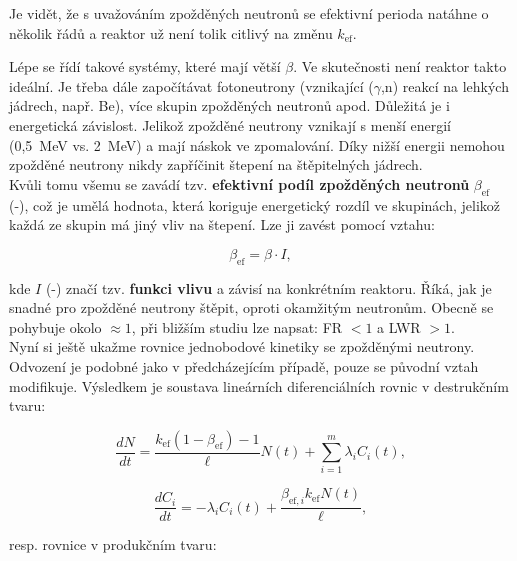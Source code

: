 Je vidět, že s uvažováním zpožděných neutronů se efektivní perioda natáhne o několik řádů a reaktor už není tolik citlivý na změnu $k_{\text{ef}}$.\\

\normalsize

Lépe se řídí takové systémy, které mají větší $\beta$. Ve skutečnosti není reaktor takto ideální. Je třeba dále započítávat fotoneutrony (vznikající ($\gamma$,n) reakcí na lehkých jádrech, např. Be), více skupin zpožděných neutronů apod. Důležitá je i energetická závislost. Jelikož zpožděné neutrony vznikají s menší energií (0,5~MeV vs. 2~MeV) a mají náskok ve zpomalování. Díky nižší energii nemohou zpožděné neutrony nikdy zapříčinit štepení na štěpitelných jádrech.\\

Kvůli tomu všemu se zavádí tzv. \textbf{efektivní podíl zpožděných neutronů} $\beta_{\text{ef}}$ (-), což je umělá hodnota, která koriguje energetický rozdíl ve skupinách, jelikož každá ze skupin má jiný vliv na štepení. Lze ji zavést pomocí vztahu:

\begin{equation}
  \beta_{\text{ef}} = \beta \cdot I,
\end{equation}

kde $I$ (-) značí tzv. \textbf{funkci vlivu} a závisí na konkrétním reaktoru. Říká, jak je snadné pro zpožděné neutrony štěpit, oproti okamžitým neutronům. Obecně se pohybuje okolo $\approx 1$, při bližším studiu lze napsat: FR $<1$ a LWR $>1$.\\

Nyní si ještě ukažme rovnice jednobodové kinetiky se zpožděnými neutrony. Odvození je podobné jako v předcházejícím případě, pouze se původní vztah modifikuje. Výsledkem je soustava lineárních diferenciálních rovnic v destrukčním tvaru:

\begin{equation}
  \boxed{
  \dfrac{dN}{dt} = \dfrac{k_{\text{ef}}(1-\beta_{\text{ef}})-1}{\ell} N(t) + \sum_{i=1}^m \lambda_i C_i(t),
  \label{rovnice_kinetiky_zpozdenky_1}}
\end{equation}

\begin{equation}
  \boxed{
  \dfrac{dC_i}{dt} = -\lambda_i C_i(t) + \dfrac{\beta_{\text{ef},i} k_{\text{ef}} N(t)}{\ell},
  \label{rovnice_kinetiky_zpozdenky_2}}
\end{equation}

resp. rovnice v produkčním tvaru:

